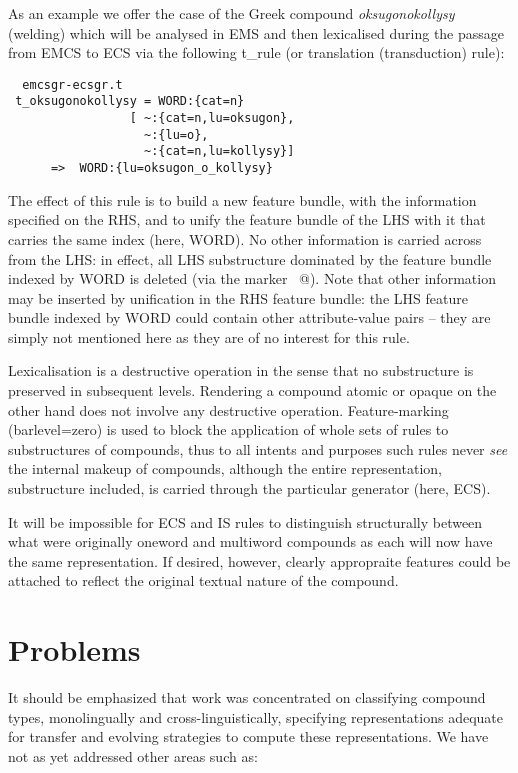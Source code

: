 As   an  example  we  offer  the  case  of  the  Greek   compound 
{\it oksugonokollysy} (welding)  which will be analysed in  EMS  and 
then  lexicalised  during the passage from EMCS to  ECS  via  the 
following t\_rule (or translation (transduction) rule): 

\begin{verbatim}
  emcsgr-ecsgr.t
 t_oksugonokollysy = WORD:{cat=n}
                 [ ~:{cat=n,lu=oksugon},
                   ~:{lu=o},
                   ~:{cat=n,lu=kollysy}]
      =>  WORD:{lu=oksugon_o_kollysy}
\end{verbatim}

The  effect  of  this  rule is to build  a  new  feature  bundle, 
with  the  information specified on the RHS,  and  to  unify  the 
feature  bundle  of the LHS with it that carries the  same  index 
(here,  WORD).  No  other information is carried across from  the 
LHS:  in  effect,  all LHS substructure dominated by the  feature 
bundle indexed by WORD is deleted (via the marker \verb@~@). Note that other 
information  may  be inserted by unification in the  RHS  feature 
bundle:  the  LHS  feature bundle indexed by WORD  could  contain 
other attribute-value pairs -- they are simply not mentioned here 
as they are of no interest for this rule.


Lexicalisation  is  a destructive operation in the sense that  no
substructure  is  preserved in  subsequent  levels.  Rendering  a
compound   atomic  or  opaque  on  the  other   hand   does   not  
involve      any    destructive    operation.     Feature-marking 
(barlevel=zero)  is used to block  the application of whole  sets 
of  rules to substructures of compounds,   thus  to  all  intents 
and  purposes  such  rules  never {\em see}  the  internal makeup  of  
compounds,   although  the  entire representation,   substructure  
included,   is  carried through  the particular generator  (here, 
ECS).


It  will  
be  impossible  for ECS and IS rules  to distinguish structurally 
between  what  were \mbox{originally} oneword and multiword compounds as 
each will now have the same representation.  If desired, however, 
clearly  appropraite  features could be attached to  reflect  the 
original textual nature of the compound.

\section{Problems}

It should be emphasized that work was concentrated on classifying 
compound   types,    monolingually   and    cross-linguistically, 
specifying  representations  adequate for transfer  and  evolving 
strategies  to compute these representations.  We have not as yet 
addressed other areas such as:

